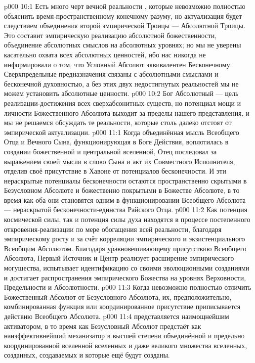 \vs p000 10:1 Есть много черт вечной реальности , которые невозможно полностью объяснить время\hyp{}пространственному конечному разуму, но актуализация  будет следствием объединения второй эмпирической Троицы --- Абсолютной Троицы. Это составит эмпирическую реализацию абсолютной божественности, объединение абсолютных смыслов на абсолютных уровнях; но мы не уверены касательно охвата всех абсолютных ценностей, ибо нас никогда не информировали о том, что Условный Абсолют эквивалентен Бесконечному. Сверхпредельные предназначения связаны с абсолютными смыслами и бесконечной духовностью, а без этих двух недостигнутых реальностей мы не можем установить абсолютные ценности.
\vs p000 10:2 Бог Абсолютный --- цель реализации\hyp{}достижения всех сверхабсонитных существ, но потенциал мощи и личности Божественного Абсолюта выходит за пределы нашего представления, и мы не решаемся обсуждать те реальности, которые столь далеко отстоят от эмпирической актуализации.
\vs p000 11:1 Когда объединённая мысль Всеобщего Отца и Вечного Сына, функционирующая в Боге Действия, воплотилась в создании божественной и центральной вселенной, Отец последовал за выражением своей мысли в слово Сына и акт их Совместного Исполнителя, отделив своё присутствие в Хавоне от потенциалов бесконечности. И эти нераскрытые потенциалы бесконечности остаются пространственно скрытыми в Безусловном Абсолюте и божественно покрытыми в Божестве Абсолюте, в то время как оба они становятся одним в функционировании Всеобщего Абсолюта --- нераскрытой бесконечности\hyp{}единства Райского Отца.
\vs p000 11:2 Как потенция космической силы, так и потенция силы духа находятся в процессе постепенного откровения\hyp{}реализации по мере обогащения всей реальности, благодаря эмпирическому росту и за счёт корреляции эмпирического и экзистенциального Всеобщим Абсолютом. Благодаря уравновешивающему присутствию Всеобщего Абсолюта, Первый Источник и Центр реализует расширение эмпирического могущества, испытывает идентификацию со своими эволюционными созданиями и достигает распространения эмпирического Божества на уровнях Верховности, Предельности и Абсолютности.
\vs p000 11:3 \pc Когда невозможно полностью отличить Божественный Абсолют от Безусловного Абсолюта, их, предположительно, комбинированная функция или координированное присутствие приписывается действию Всеобщего Абсолюта.
\vs p000 11:4 \pc {} представляется наимощнейшим активатором, в то время как Безусловный Абсолют предстаёт как наиэффективнейший механизатор в высшей степени объединённой и предельно координированной вселенной вселенных и даже великого множества вселенных, созданных, создаваемых и которые ещё будут созданы.
